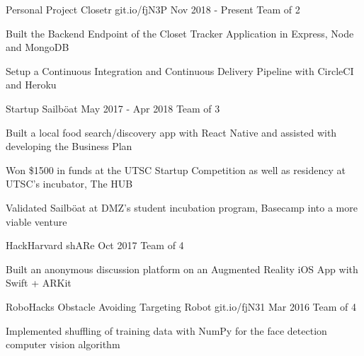 \begin{cventries}
\cventry
    {Personal Project}
    {Closetr}
    {git.io/fjN3P}
    {Nov 2018 - Present}
    {Team of 2}
    {
      \begin{cvitems}
        \item{Built the Backend Endpoint of the Closet Tracker Application in Express, Node and MongoDB}
        \item{Setup a Continuous Integration and Continuous Delivery Pipeline with CircleCI and Heroku}
      \end{cvitems}
    }
\cventry
  {Startup}
  {Sailböat}
  {}
  {May 2017 - Apr 2018}
  {Team of 3}
  {
    \begin{cvitems}
      \item {Built a local food search/discovery app with React Native and assisted with developing the Business Plan}
      \item {Won \$1500 in funds at the UTSC Startup Competition as well as residency at UTSC's incubator, The HUB}
      \item {Validated Sailböat at DMZ's student incubation program, Basecamp into a more viable venture}
    \end{cvitems}
  }
\cventry
  {HackHarvard}
  {shARe}
  {}
  {Oct 2017}
  {Team of 4}
  {
    \begin{cvitems}
      \item {Built an anonymous discussion platform on an Augmented Reality iOS App with Swift + ARKit}
    \end{cvitems}
  }
\cventry
  {RoboHacks}
  {Obstacle Avoiding Targeting Robot}
  {git.io/fjN31}
  {Mar 2016}
  {Team of 4}
  {
    \begin{cvitems}
      \item {Implemented shuffling of training data with NumPy for the face detection computer vision algorithm}
    \end{cvitems}
  }
\end{cventries}
